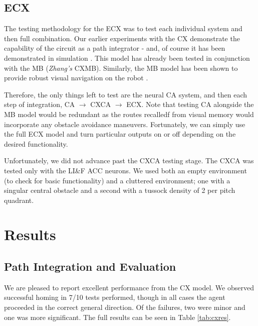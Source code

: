 \documentclass[a4paper,11pt,twoside,openright]{article}
\let\oldsection\section
\def\section{\cleardoublepage\oldsection}
\begin{document}
\subsection{ECX}
The testing methodology for the ECX was to test each individual system
and then full combination. Our earlier experiments with the CX
demonstrate the capability of the circuit as a path integrator - and,
of course it has been demonstrated in simulation
\cite{Stone2017}. This model has already been tested in conjunction
with the MB (\textit{Zhang's} CXMB)\cite{Zhang2017}. Similarly, the MB
model has been shown to provide robust visual navigation on the robot
\cite{Mitchell2018}.\newline\par

Therefore, the only things left to test are the neural CA system, and
then each step of integration, CA $\rightarrow$ CXCA $\rightarrow$
ECX. Note that testing CA alongside the MB model would be redundant as
the routes recalledf from visual memory would incorporate any obstacle
avoidance maneuvers. Fortunately, we can simply use the full ECX model
and turn particular outputs on or off depending on the desired
functionality.
\newline\par

Unfortunately, we did not advance past the CXCA testing stage. The
CXCA was tested only with the LI\&F ACC neurons. We used both an empty
environment (to check for basic functionality) and a cluttered
environment; one with a singular central obstacle and a second with a
tussock density of 2 per pitch quadrant.
\newpage

\section{ Results } \label{sec:results}
\subsection{ Path Integration and Evaluation }
We are pleased to report excellent performance from the CX model. We
observed successful homing in 7/10 tests performed, though in all
cases the agent proceeded in the correct general direction. Of the
failures, two were minor and one was more significant. The full
results can be seen in Table \ref{tab:cxres}.
\newline
\par
\end{document}
